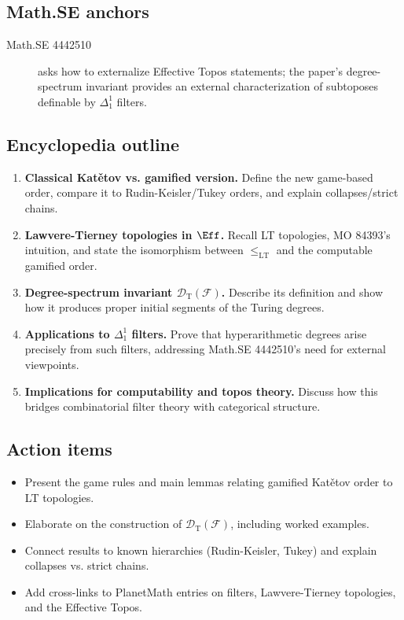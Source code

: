 \subsection*{Math.SE anchors}
\begin{description}
  \item[Math.SE 4442510] asks how to externalize Effective Topos statements; the paper’s degree-spectrum invariant provides an external characterization of subtoposes definable by $\Delta^1_1$ filters.
\end{description}
\subsection*{Encyclopedia outline}
\begin{enumerate}
  \item \textbf{Classical Katětov vs. gamified version.} Define the new game-based order, compare it to Rudin-Keisler/Tukey orders, and explain collapses/strict chains.
  \item \textbf{Lawvere-Tierney topologies in $\Eff$.} Recall LT topologies, MO 84393’s intuition, and state the isomorphism between $\leq_{\mathrm{LT}}$ and the computable gamified order.
  \item \textbf{Degree-spectrum invariant $\mathcal{D}_{\mathrm{T}}(\mathcal{F})$.} Describe its definition and show how it produces proper initial segments of the Turing degrees.
  \item \textbf{Applications to $\Delta^1_1$ filters.} Prove that hyperarithmetic degrees arise precisely from such filters, addressing Math.SE 4442510’s need for external viewpoints.
  \item \textbf{Implications for computability and topos theory.} Discuss how this bridges combinatorial filter theory with categorical structure.
\end{enumerate}
\subsection*{Action items}
\begin{itemize}
  \item Present the game rules and main lemmas relating gamified Katětov order to LT topologies.
  \item Elaborate on the construction of $\mathcal{D}_{\mathrm{T}}(\mathcal{F})$, including worked examples.
  \item Connect results to known hierarchies (Rudin-Keisler, Tukey) and explain collapses vs. strict chains.
  \item Add cross-links to PlanetMath entries on filters, Lawvere-Tierney topologies, and the Effective Topos.
\end{itemize}
